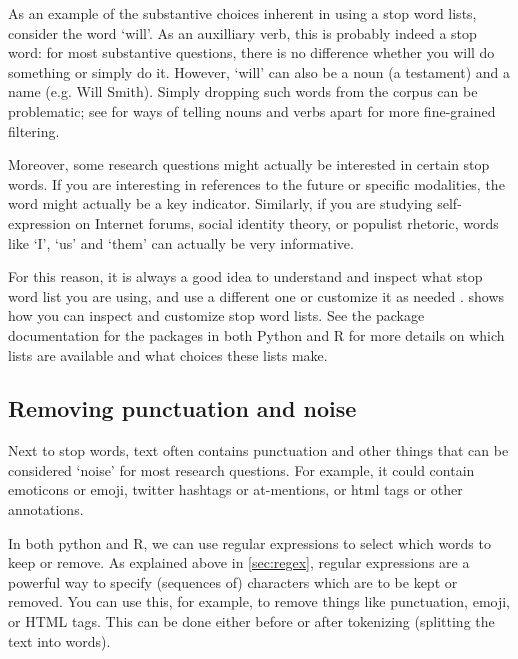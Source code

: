 As an example of the substantive choices inherent in using a stop word lists,
consider the word `will'.
As an auxilliary verb, this is probably indeed a stop word: for most substantive questions, there is no difference
whether you will do something or simply do it.
However, `will' can also be a noun (a testament) and a name (e.g. Will Smith).
Simply dropping such words from the corpus can be problematic; see  for ways of telling nouns and verbs apart
for more fine-grained filtering.

Moreover, some research questions might actually be interested in certain stop words.
If you are interesting in references to the future or specific modalities,
the word might actually be a key indicator. 
Similarly, if you are studying self-expression on Internet forums, social identity theory, or populist rhetoric,
words like `I', `us' and `them' can actually be very informative.

For this reason, it is always a good idea to understand and inspect what stop word list you are using,
and use a different one or customize it as needed \citep[see also][]{nothman18}.
 shows how you can inspect and customize stop word lists.
See the package documentation for the  packages in both Python and R
for more details on which lists are available and what choices these lists make. 



\subsection{Removing punctuation and noise}

Next to stop words, text often contains punctuation and other things that can be considered `noise' for most research questions.
For example, it could contain emoticons or emoji, twitter hashtags or at-mentions, or html tags or other annotations.

In both python and R, we can use regular expressions to select which words to keep or remove.
As explained above in \ref{sec:regex}, regular expressions are a powerful way to specify (sequences of) characters which are to be kept or removed.
You can use this, for example, to remove things like punctuation, emoji, or HTML tags.
This can be done either before or after tokenizing (splitting the text into words). 

